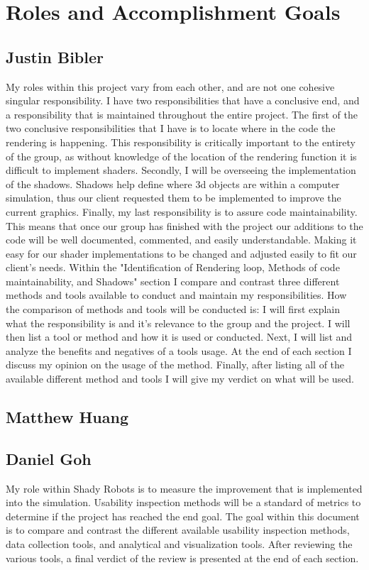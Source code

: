 \documentclass[10pt,journal,compsoc,draftclsnofoot]{IEEEtran}
\begin{document}
\section{Roles and Accomplishment Goals}

\subsection{Justin Bibler}
My roles within this project vary from each other, and are not one cohesive singular responsibility.
I have two responsibilities that have a conclusive end, and a responsibility that is maintained throughout the entire project.
The first of the two conclusive responsibilities that I have is to locate where in the code the rendering is happening.
This responsibility is critically important to the entirety of the group, as without knowledge of the location of the rendering function it is difficult to implement shaders.
Secondly, I will be overseeing the implementation of the shadows.
Shadows help define where 3d objects are within a computer simulation, thus our client requested them to be implemented to improve the current graphics.
Finally, my last responsibility is to assure code maintainability.
This means that once our group has finished with the project our additions to the code will be well documented, commented, and easily understandable.
Making it easy for our shader implementations to be changed and adjusted easily to fit our client's needs.
\indent
Within the "Identification of Rendering loop, Methods of code maintainability, and Shadows" section I compare and contrast three different methods and tools available to conduct and maintain my responsibilities.
How the comparison of methods and tools will be conducted is: I will first explain what the responsibility is and it's relevance to the group and the project.
I will then list a tool or method and how it is used or conducted.
Next, I will list and analyze the benefits and negatives of a tools usage.
At the end of each section I discuss my opinion on the usage of the method.
Finally, after listing all of the available different method and tools I will give my verdict on what will be used.

\subsection{Matthew Huang}

\subsection{Daniel Goh}
My role within Shady Robots is to measure the improvement that is implemented into the simulation.
Usability inspection methods will be a standard of metrics to determine if the project has reached the end goal.
The goal within this document is to compare and contrast the different available usability inspection methods, data collection tools, and analytical and visualization tools.
After reviewing the various tools, a final verdict of the review is presented at the end of each section.
\end{document}
